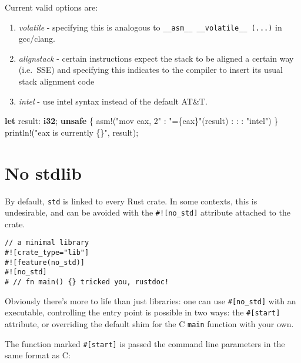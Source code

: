 \documentclass[a4paper,]{book}
\newenvironment{Shaded}{\begin{snugshade}}{\end{snugshade}}
\newcommand{\KeywordTok}[1]{\textcolor[rgb]{0.13,0.29,0.53}{\textbf{{#1}}}}
\newcommand{\StringTok}[1]{\textcolor[rgb]{0.31,0.60,0.02}{{#1}}}
\newcommand{\OtherTok}[1]{\textcolor[rgb]{0.56,0.35,0.01}{{#1}}}
\newcommand{\NormalTok}[1]{{#1}}
\begin{document}
Current valid options are:

\begin{enumerate}
\def\labelenumi{\arabic{enumi}.}
\itemsep1pt\parskip0pt
\item
  \emph{volatile} - specifying this is analogous to
  \texttt{\_\_asm\_\_\ \_\_volatile\_\_\ (...)} in gcc/clang.
\item
  \emph{alignstack} - certain instructions expect the stack to be
  aligned a certain way (i.e.~SSE) and specifying this indicates to the
  compiler to insert its usual stack alignment code
\item
  \emph{intel} - use intel syntax instead of the default AT\&T.
\end{enumerate}

\begin{Shaded}
\begin{Highlighting}[]
\KeywordTok{let} \NormalTok{result: }\KeywordTok{i32}\NormalTok{;}
\KeywordTok{unsafe} \NormalTok{\{}
   \OtherTok{asm!}\NormalTok{(}\StringTok{"mov eax, 2"} \NormalTok{: }\StringTok{"=\{eax\}"}\NormalTok{(result) : : : }\StringTok{"intel"}\NormalTok{)}
\NormalTok{\}}
\OtherTok{println!}\NormalTok{(}\StringTok{"eax is currently \{\}"}\NormalTok{, result);}
\end{Highlighting}
\end{Shaded}

\section{No stdlib}\label{sec--no-stdlib}

By default, \texttt{std} is linked to every Rust crate. In some
contexts, this is undesirable, and can be avoided with the
\texttt{\#!{[}no\_std{]}} attribute attached to the crate.

\begin{verbatim}
// a minimal library
#![crate_type="lib"]
#![feature(no_std)]
#![no_std]
# // fn main() {} tricked you, rustdoc!
\end{verbatim}

Obviously there's more to life than just libraries: one can use
\texttt{\#{[}no\_std{]}} with an executable, controlling the entry point
is possible in two ways: the \texttt{\#{[}start{]}} attribute, or
overriding the default shim for the C \texttt{main} function with your
own.

The function marked \texttt{\#{[}start{]}} is passed the command line
parameters in the same format as C:
\end{document}
